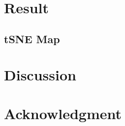 \documentclass[aps, 10pt, a4paper]{article}
\begin{document}
    \section{Result}
        \subsection{tSNE Map}
    
    \section{Discussion}
    
    \section{Acknowledgment}
    
    
    

    
\end{document}
